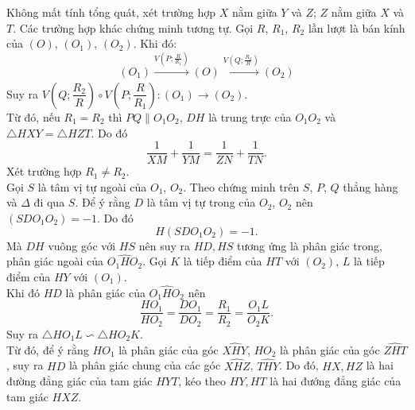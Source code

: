 \begin{bt}
{\begin{center}
\end{center}
Không mất tính tổng quát, xét trường hợp $X$ nằm giữa $Y$ và $Z$; $Z$ nằm giữa $X$ và $T$. Các trường hợp khác chứng minh tương tự. 
Gọi $R$, $R_1$, $R_2$ lần lượt là bán kính của $(O)$, $(O_1)$, $(O_2)$. Khi đó: 
$$(O_1) \xrightarrow[]{V\left(P; \frac{R}{R_1}\right)}(O)\xrightarrow[]{V\left(Q; \frac{R_2}{R}\right)}(O_2)$$
Suy ra $V\left(Q; \dfrac{R_2}{R}\right)\circ V\left(P; \dfrac{R}{R_1}\right):(O_1) \rightarrow (O_2).$\\
Từ đó, nếu $R_1=R_2$ thì $PQ\parallel O_1O_2$, $DH$ là trung trực của $O_1O_2$ và $\triangle HXY=\triangle HZT$. Do đó
$$\dfrac{1}{XM}+\dfrac{1}{YM}=\dfrac{1}{ZN}+\dfrac{1}{TN}.$$
Xét trường hợp $R_1\neq R_2$.\\
Gọi $S$ là tâm vị tự ngoài của $O_1$, $O_2$. Theo chứng minh trên $S$, $P$, $Q$ thẳng hàng và $\Delta$ đi qua $S$. Để ý rằng $D$ là tâm vị tự trong của $O_2$, $O_2$ nên $(SDO_1O_2)=-1$. Do đó
$$H(SDO_1O_2)=-1.$$ 
Mà $DH$ vuông góc với $HS$ nên suy ra $HD, HS$ tương ứng là phân giác trong, phân giác ngoài của  $\widehat{O_1HO_2}$. Gọi $K$ là tiếp điểm của $HT$ với $(O_2)$, $L$ là tiếp điểm của $HY$ với $(O_1)$.\\
Khi đó $HD$ là phân giác của $\widehat{O_1HO_2}$ nên $$\dfrac{HO_1}{HO_2}=\dfrac{DO_1}{DO_2}=\dfrac{R_1}{R_2}=\dfrac{O_1L}{O_2K}.$$
Suy ra $\triangle HO_1L\backsim \triangle HO_2K$.\\
Từ đó, để ý rằng $HO_1$ là phân giác của góc $\widehat{XHY}$, $HO_2$ là phân giác của góc $\widehat{ZHT}$, suy ra $HD$ là phân giác chung của các góc $\widehat{XHZ}$, $\widehat{THY}$. Do đó, $HX, HZ$ là hai đường đẳng giác của tam giác $HYT$, kéo theo $HY, HT$ là hai đướng đẳng giác của tam giác $HXZ$.

}
\end{bt}
